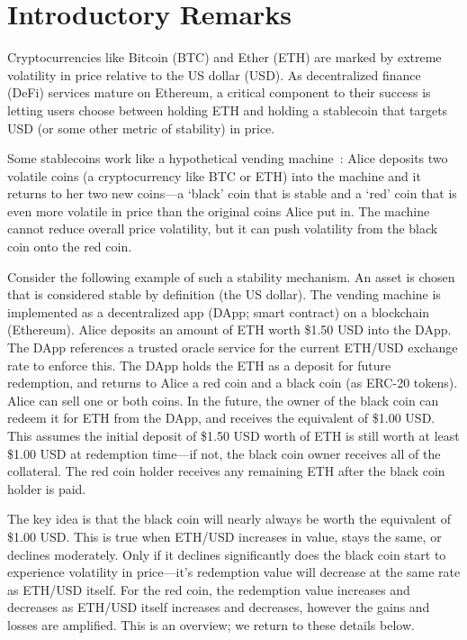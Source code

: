 

\section{Introductory Remarks}

Cryptocurrencies like Bitcoin (BTC) and Ether (ETH) are marked by extreme volatility in price relative to the US dollar (USD). As decentralized finance (DeFi) services mature on Ethereum, a critical component to their success is letting users choose between holding ETH and holding a stablecoin that targets USD (or some other metric of stability) in price.

Some stablecoins work like a hypothetical vending machine~\cite{CDM20}: Alice deposits two volatile coins (\eg a cryptocurrency like BTC or ETH) into the machine and it returns to her two new coins---a `black' coin that is stable and a `red' coin that is even more volatile in price than the original coins Alice put in. The machine cannot reduce overall price volatility, but it can push volatility from the black coin onto the red coin. 

Consider the following example of such a stability mechanism. An asset is chosen that is considered stable by definition (\eg the US dollar). The vending machine is implemented as a decentralized app (DApp; \aka smart contract) on a blockchain (\eg Ethereum). Alice deposits an amount of ETH worth \$1.50 USD into the DApp. The DApp references a trusted oracle service for the current ETH/USD exchange rate to enforce this. The DApp holds the ETH as a deposit for future redemption, and returns to Alice a red coin and a black coin (\eg as ERC-20 tokens). Alice can sell one or both coins. In the future, the owner of the black coin can redeem it for ETH from the DApp, and receives the equivalent of \$1.00 USD. This assumes the initial deposit of \$1.50 USD worth of ETH is still worth at least \$1.00 USD at redemption time---if not, the black coin owner receives all of the collateral. The red coin holder receives any remaining ETH after the black coin holder is paid.

The key idea is that the black coin will nearly always be worth the equivalent of \$1.00 USD. This is true when ETH/USD increases in value, stays the same, or declines moderately. Only if it declines significantly does the black coin start to experience volatility in price---it's redemption value will decrease at the same rate as ETH/USD itself. For the red coin, the redemption value increases and decreases as ETH/USD itself increases and decreases, however the gains and losses are amplified. This is an overview; we return to these details below.

